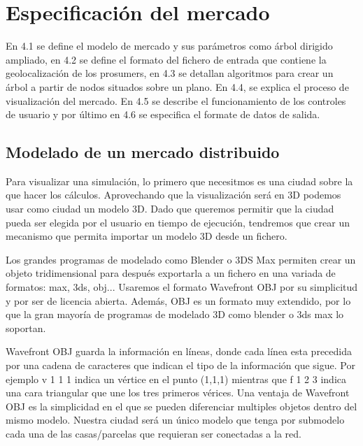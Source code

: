 \documentclass[12pt,a4paper,openright,oneside]{article}
\numberwithin{equation}{section}
\theoremstyle{definition}
\begin{document}
\newpage




\section{Especificación del mercado}

En 4.1 se define el modelo de mercado y sus parámetros como árbol dirigido ampliado, en 4.2 se define el formato del fichero de entrada que contiene la geolocalización de los prosumers, en 4.3 se detallan algoritmos para crear un árbol a partir de nodos situados sobre un plano. En 4.4, se explica el proceso de visualización del mercado. En 4.5 se describe el funcionamiento de los controles de usuario y por último en 4.6 se especifica el formate de datos de salida.

\subsection{Modelado de un mercado distribuido}
Para visualizar una simulación, lo primero que necesitmos es una ciudad sobre la que hacer los cálculos. Aprovechando que la visualización será en 3D podemos usar como ciudad un modelo 3D. Dado que queremos permitir que la ciudad pueda ser elegida por el usuario en tiempo de ejecución, tendremos que crear un mecanismo que permita importar un modelo 3D desde un fichero.

Los grandes programas de modelado como Blender o 3DS Max permiten crear un objeto tridimensional para después exportarla a un fichero en una variada de formatos: max, 3ds, obj... Usaremos el formato Wavefront OBJ por su simplicitud y por ser de licencia abierta. Además, OBJ es un formato muy extendido, por lo que la gran mayoría de programas de modelado 3D como blender o 3ds max lo soportan.

Wavefront OBJ guarda la información en líneas, donde cada línea esta precedida por una cadena de caracteres que indican el tipo de la información que sigue. Por ejemplo v 1 1 1 indica un vértice en el punto (1,1,1) mientras que f 1 2 3 indica una cara triangular que une los tres primeros vérices.
Una ventaja de Wavefront OBJ es la simplicidad en el que se pueden diferenciar multiples objetos dentro del mismo modelo. Nuestra ciudad será un único modelo que tenga por submodelo cada una de las casas/parcelas que requieran ser conectadas a la red. 
\end{document}
